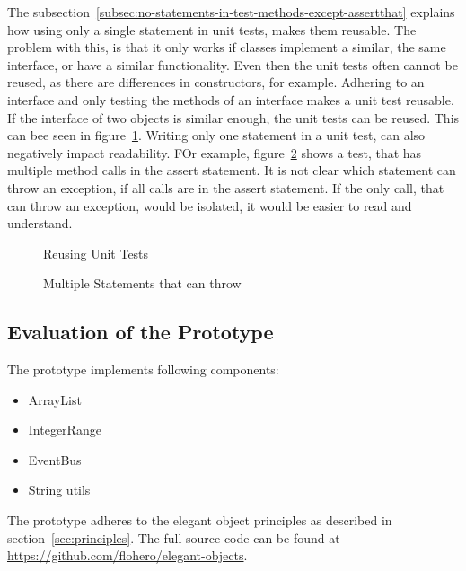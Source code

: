 The subsection\ \ref{subsec:no-statements-in-test-methods-except-assertthat} explains how using only a single statement in unit tests, makes them reusable.
The problem with this, is that it only works if classes implement a similar, the same interface, or have a similar functionality.
Even then the unit tests often cannot be reused, as there are differences in constructors, for example.
Adhering to an interface and only testing the methods of an interface makes a unit test reusable.
If the interface of two objects is similar enough, the unit tests can be reused.
This can bee seen in figure\ \ref{fig:reused-unit-tests}.
Writing only one statement in a unit test, can also negatively impact readability.
FOr example, figure\ \ref{fig:multiple-statements-can-throw} shows a test, that has multiple method calls in the assert statement.
It is not clear which statement can throw an exception, if all calls are in the assert statement.
If the only call, that can throw an exception, would be isolated, it would be easier to read and understand.

\begin{figure}[h]
    \caption{Reusing Unit Tests}
    
    
    \label{fig:reused-unit-tests}
\end{figure}

\begin{figure}[h]
    \caption{Multiple Statements that can throw}
    
    \label{fig:multiple-statements-can-throw}
\end{figure}

\subsection{Evaluation of the Prototype}\label{subsec:evaluation-of-the-prototype}
The prototype implements following components:
\begin{itemize}
    \item ArrayList
    \item IntegerRange
    \item EventBus
    \item String utils
\end{itemize}
The prototype adheres to the elegant object principles as described in section\ \ref{sec:principles}.
The full source code can be found at \url{https://github.com/flohero/elegant-objects}.

